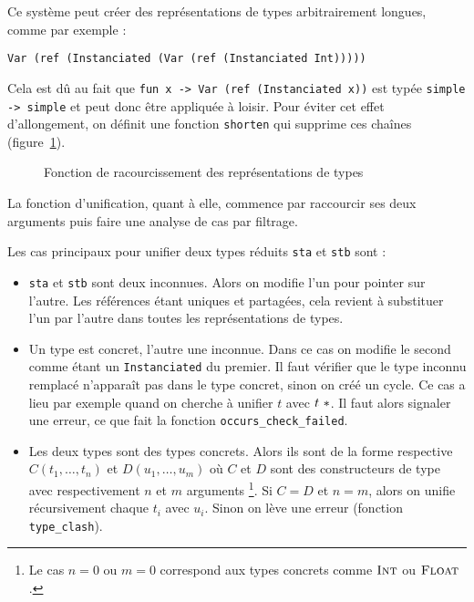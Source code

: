 Ce système peut créer des représentations de types arbitrairement longues, comme
par exemple :

\texttt{Var (ref (Instanciated (Var (ref (Instanciated Int)))))}

Cela est dû au fait que \texttt{fun x -> Var (ref (Instanciated x))} est typée
\texttt{simple -> simple} et peut donc être appliquée à loisir. Pour éviter cet
effet d'allongement, on définit une fonction \texttt{shorten} qui supprime ces
chaînes (figure~\ref{fig:implem-shorten}).


\begin{figure}


\caption{Fonction de racourcissement des représentations de types}
\label{fig:implem-shorten}
\end{figure}

La fonction d'unification, quant à elle, commence par raccourcir ses deux
arguments puis faire une analyse de cas par filtrage.

Les cas principaux pour unifier deux types réduits \texttt{sta} et \texttt{stb}
sont :

\begin{itemize}

\item \texttt{sta} et \texttt{stb} sont deux inconnues. Alors on modifie l'un
  pour pointer sur l'autre. Les références étant uniques et partagées, cela
  revient à substituer l'un par l'autre dans toutes les représentations de
  types.

\item Un type est concret, l'autre une inconnue. Dans ce cas on modifie le
  second comme étant un \texttt{Instanciated} du premier. Il faut vérifier que
  le type inconnu remplacé n'apparaît pas dans le type concret, sinon on créé un
  cycle. Ce cas a lieu par exemple quand on cherche à unifier $t$ avec
  $t~*$. Il faut alors signaler une erreur, ce que fait la fonction
  \texttt{occurs\_check\_failed}.

\item Les deux types sont des types concrets. Alors ils sont de la forme
  respective
  $C (t_1, …, t_n)$
  et
  $D (u_1, …, u_m)$ où $C$ et $D$ sont des constructeurs de type avec
  respectivement $n$ et $m$ arguments
  \footnote{
    Le cas $n = 0$ ou $m = 0$ correspond aux types concrets comme $\textsc{Int}$ ou
    $\textsc{Float}$.
  }. Si $C = D$ et
  $n = m$, alors on unifie récursivement chaque $t_i$ avec $u_i$. Sinon on lève
  une erreur (fonction \texttt{type\_clash}).


\end{itemize}

